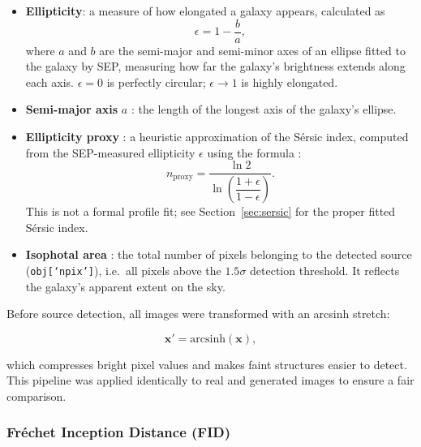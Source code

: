 \documentclass[fleqn,usenatbib]{mnras}
\begin{document}
\begin{itemize}
    \item \textbf{Ellipticity}: a measure of how elongated a galaxy
    appears, calculated as
    \begin{equation}
        \epsilon = 1 - \frac{b}{a},
        \label{eq:ellipticity}
    \end{equation}
    where $a$ and $b$ are the semi-major and semi-minor axes of an
    ellipse fitted to the galaxy by SEP, 
    measuring how far the galaxy's brightness extends along each axis.
    $\epsilon = 0$ is perfectly circular; $\epsilon \to 1$ is highly
    elongated.

    \item \textbf{Semi-major axis} $a$ : the length of the longest axis of the galaxy’s ellipse.

    \item \textbf{Ellipticity proxy} : a heuristic approximation of
    the S\'{e}rsic index, computed from the SEP-measured
    ellipticity $\epsilon$ using the formula \citep{lizarraga2024}:
    \begin{equation}
        n_{\mathrm{proxy}} = \frac{\ln 2}{\ln\!\left(\dfrac{1+\epsilon}{1-\epsilon}\right)}.
        \label{eq:proxy_sep}
    \end{equation}
    This is not a formal profile fit; see Section~\ref{sec:sersic}
    for the proper fitted S\'{e}rsic index.

    \item \textbf{Isophotal area} : the total number of pixels
    belonging to the detected source (\texttt{obj[`npix']}), i.e.\
    all pixels above the $1.5\sigma$ detection threshold.
    It reflects the galaxy's apparent extent on the sky.
\end{itemize}

Before source detection, all images were transformed with an arcsinh
stretch:

\begin{equation}
    \mathbf{x}' = \mathrm{arcsinh}(\mathbf{x}),
    \label{eq:arcsinh}
\end{equation}

which compresses bright pixel values and makes faint structures easier
to detect.
This pipeline was applied identically to real and generated images to
ensure a fair comparison.

\subsubsection{Fr\'{e}chet Inception Distance (FID)}
\label{sec:fid}
\end{document}
